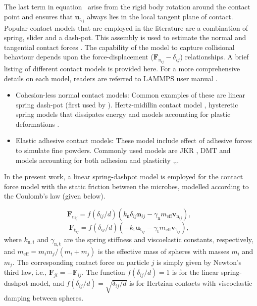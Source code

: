 \documentclass[11pt,a4paper,openright]{article}
\makeatletter
\let\mytagform@=\tagform@
\def\tagform@#1{\maketag@@@{\bfseries(\ignorespaces#1\unskip\@@italiccorr)}\hspace{3mm}}
\renewcommand{\eqref}[1]{\textup{\mytagform@{\ref{#1}}}}
\makeatother
\begin{document}
	
The last term in equation~\eqref{eqn-ut} arise from the rigid body rotation around the contact point and ensures that $\mathbf{u}_{\mathrm{t}_{ij}}$ always lies in the local tangent plane of contact. Popular contact models that are employed in the literature are a combination of spring, slider and a dash-pot. This assembly is used to estimate the normal and tangential contact forces \citep{cundall1979discrete}. The capability of the model to capture collisional behaviour depends upon the force-displacement ($\mathbf{F}_{\mathrm{n}_{ij}}-\delta_{ij}$) relationships. A brief listing of different contact models is provided here. For a more comprehensive details on each model, readers are referred to LAMMPS user manual \citep{plimpton2005lammps}. 

\begin{itemize}
\item Cohesion-less normal contact models:  Common examples of these are linear spring dash-pot (first used by \citet{cundall1979discrete}). Hertz-midillin contact model \citep{tsuji1992lagrangian}, hysteretic spring models that dissipates energy \citep{walton1986viscosity} and models accounting for plastic deformations \citep{thornton1997coefficient}.  

\item Elastic adhesive contact models: These model include effect of adhesive forces to simulate fine powders. Commonly used models are JKR \citep{johnson1971surface}, DMT \citep{derjaguin1980different} and models accounting for both adhesion and plasticity \citep{thornton1998theoretical},\citep{luding2008cohesive},\citep{thakur2014micromechanical}.   
\end{itemize}

In the present work, a linear spring-dashpot model is employed for the contact force model with the static friction between the microbes, modelled according to the Coulomb's law (given below). 

	\begin{equation}
		\mathbf{F}_{\mathrm{n}_{ij}} = f(\delta_{ij}/d)(k_{\mathrm{n}}\delta_{ij}\mathbf{n}_{ij} 
		- \gamma_{\mathrm{n}} m_{\mathrm{eff}}\mathbf{v}_{\mathrm{n}_{ij}})\text{,}
	\end{equation}
	\begin{equation}
		\mathbf{F}_{\mathrm{t}_{ij}} = f(\delta_{ij}/d)(-k_{\mathrm{t}}\mathbf{u}_{\mathrm{t}_{ij}} 
		- \gamma_{\mathrm{t}}m_{\mathrm{eff}}\mathbf{v}_{\mathrm{t}_{ij}})\text{,}
	\end{equation}
	where $k_{\mathrm{n,t}}$ and $\gamma_{\mathrm{n,t}}$ are the spring stiffness
        and viscoelastic constants, respectively, and
        $m_{\mathrm{eff}} =m_im_j /(m_i + m_j)$ is the effective mass
        of spheres with masses $m_i$ and $m_j$. The corresponding
        contact force on particle $j$ is simply given by Newton's
        third law, i.e., $\mathbf{F}_{ji} = -\mathbf{F}_{ij}$. The
        function $f(\delta_{ij}/d)=1$ is for the linear spring-dashpot
        model, and $f(\delta_{ij}/d)=\sqrt{\delta_{ij}/d}$ is for
        Hertzian contacts with viscoelastic damping between spheres.
\end{document}
